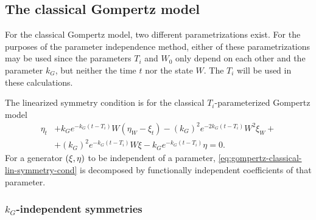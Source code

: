 \subsection{The classical Gompertz model}

For the classical Gompertz model, two different parametrizations exist.
For the purposes of the parameter independence method, either of these parametrizations may be used since the parameters \(T_i\) and \(W_0\) only depend on each other and the parameter \(k_G\), but neither the time \(t\) nor the state \(W\).
The \(T_i\) will be used in these calculations.

The linearized symmetry condition  is for the classical \(T_i\)-parameterized Gompertz model
\begin{equation}\label{eq:gompertz-classical-lin-symmetry-cond}
  \begin{split}
    \eta_t &+ k_G e^{-k_G (t - T_i)} W\left(\eta_W - \xi_t\right) - (k_G)^2 e^{-2k_G (t - T_i)} W^2 \xi_W +\\ &+ (k_G)^2 e^{-k_G (t - T_i)} W \xi - k_G e^{-k_G (t - T_i)} \eta = 0.
  \end{split}
\end{equation}
For a generator \(\qty(\xi, \eta)\) to be independent of a parameter, \cref{eq:gompertz-classical-lin-symmetry-cond} is decomposed by functionally independent coefficients of that parameter.

\subsubsection{\texorpdfstring{\(k_G\)-independent symmetries}{Growth rate-independent symmetries}}

